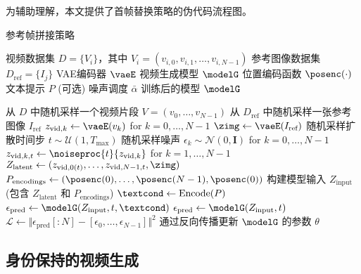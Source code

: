 为辅助理解，本文提供了首帧替换策略的伪代码流程图。
{\small
\begin{algorithm}[H]
    \setlength{\baselineskip}{0.9\baselineskip}
    \caption{参考帧拼接策略}
    \label{alg:ref_frame_concat}
    \begin{algorithmic}[1]
    \Require
        \Statex 视频数据集 $D = \{V_i\}$，其中 $V_i = (v_{i,0}, v_{i,1}, \dots, v_{i,N-1})$
        \Statex 参考图像数据集 $D_{\text{ref}} = \{I_j\}$
        \Statex VAE编码器 $\vaeE$
        \Statex 视频生成模型 $\modelG$
        \Statex 位置编码函数 $\posenc(\cdot)$
        \Statex 文本提示 $P$ (可选)
        \Statex 噪声调度 $\bar{\alpha}$
    \Ensure 训练后的模型 $\modelG$
    
        \State 从 $D$ 中随机采样一个视频片段 $V = (v_0, \dots, v_{N-1})$
        \State 从 $D_{\text{ref}}$ 中随机采样一张参考图像 $I_{\text{ref}}$
        \State {}
        \State $z_{\text{vid},k} \gets \vaeE(v_k)$ for $k=0, \dots, N-1$
        \State $\zimg \gets \vaeE(I_{\text{ref}})$
        \State 随机采样扩散时间步 $t \sim \mathcal{U}(1, T_{\text{max}})$
        \State 随机采样噪声 $\epsilon_k \sim \mathcal{N}(0, \mathbf{I})$ for $k=0, \dots, N-1$
        \State {}
        \State $z_{\text{vid},k,t} \gets \noiseproc{t}{z_{\text{vid},k}}$ for $k=1, \dots, N-1$
        \State {}
        \State $Z_{\text{latent}} \gets (z_{\text{vid},0(t)}, \dots, z_{\text{vid},N-1,t}, \zimg)$ 
        \State {}
        \State $P_{\text{encodings}} \gets (\posenc(0), \dots, \posenc(N-1), \posenc(0))$
        \State 构建模型输入 $Z_{\text{input}}$ (包含 $Z_{\text{latent}}$ 和 $P_{\text{encodings}}$)
            \State $\textcond \gets \text{Encode}(P)$
            \State $\epsilon_{\text{pred}} \gets \modelG(Z_{\text{input}}, t, \textcond)$
        \Else
            \State $\epsilon_{\text{pred}} \gets \modelG(Z_{\text{input}}, t)$
        \EndIf
        \State {}
        \State $\mathcal{L} \gets \Vert \epsilon_{\text{pred}}[:N] - [\epsilon_0, \dots, \epsilon_{N-1}] \Vert^2$
        \State 通过反向传播更新 $\modelG$ 的参数 $\theta$
    \EndFor
    \end{algorithmic}
\end{algorithm}
}
\subsection{身份保持的视频生成}\label{sec2}

